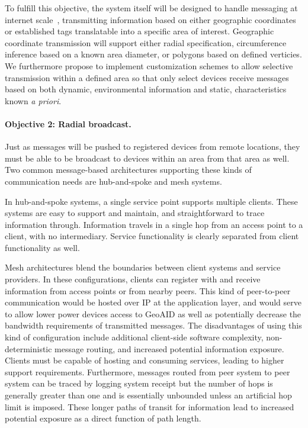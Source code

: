 \documentclass{sbir}
\begin{document}
To fulfill this objective, the system itself will be designed to handle messaging at internet scale~\cite{LiPoClGePrNuRo:12,LlFrKaAn:11,KrPaFrMa:12}, transmitting information based on either geographic coordinates or established tags translatable into a specific area of interest. Geographic coordinate transmission will support either radial specification, circumference inference based on a known area diameter, or polygons based on defined verticies. We furthermore propose to implement customization schemes to allow selective transmission within a defined area so that only select devices receive messages based on both dynamic, environmental information and static, characteristics known {\sl a priori}.

\paragraph{Objective 2: Radial broadcast.} Just as messages will be pushed to registered devices from remote locations, they must be able to be broadcast to devices within an area from that area as well. Two common message-based architectures supporting these kinds of communication needs are hub-and-spoke and mesh systems.

In hub-and-spoke systems, a single service point supports multiple clients. These systems are easy to support and maintain, and straightforward to trace information through. Information travels in a single hop from an access point to a client, with no intermediary. Service functionality is clearly separated from client functionality as well.

Mesh architectures blend the boundaries between client systems and service providers. In these configurations, clients can register with and receive information from access points or from nearby peers. This kind of peer-to-peer communication would be hosted over IP at the application layer, and would serve to allow lower power devices access to GeoAID as well as potentially decrease the bandwidth requirements of transmitted messages. The disadvantages of using this kind of configuration include additional client-side software complexity, non-deterministic message routing, and increased potential information exposure. Clients must be capable of hosting and consuming services, leading to higher support requirements. Furthermore, messages routed from peer system to peer system can be traced by logging system receipt but the number of hops is generally greater than one and is essentially unbounded unless an artificial hop limit is imposed. These longer paths of transit for information lead to increased potential exposure as a direct function of path length.
\end{document}
